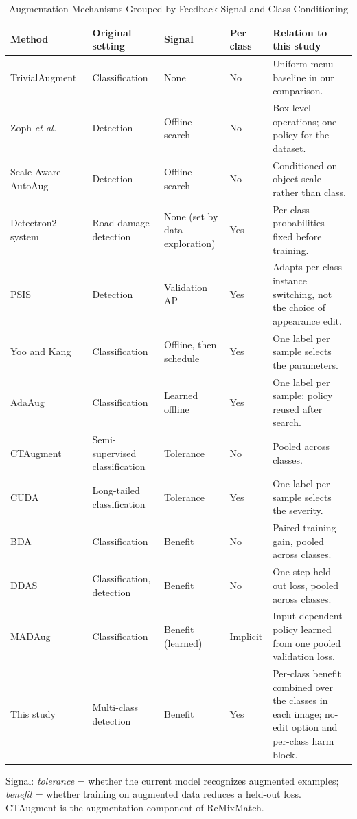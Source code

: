 \documentclass[conference]{IEEEtran}
\begin{document}
\begin{table}[t]
\caption{Augmentation Mechanisms Grouped by Feedback Signal and Class Conditioning}
\label{tab:policies}
\centering
\small
\setlength{\tabcolsep}{4pt}
\renewcommand{\arraystretch}{1.16}
\begin{tabularx}{\textwidth}{@{}p{}p{}p{}p{}Y@{}}
\toprule
\textbf{Method} & \textbf{Original setting} & \textbf{Signal} & \textbf{Per class} & \textbf{Relation to this study} \\
\midrule
TrivialAugment~\cite{muller2021trivial} & Classification & None & No & Uniform-menu baseline in our comparison. \\
Zoph \emph{et al.}~\cite{zoph2020det} & Detection & Offline search & No & Box-level operations; one policy for the dataset. \\
Scale-Aware AutoAug~\cite{chen2021scale} & Detection & Offline search & No & Conditioned on object scale rather than class. \\
Detectron2 system~\cite{rdd_detectron2} & Road-damage detection & None (set by data exploration) & Yes & Per-class probabilities fixed before training. \\
PSIS~\cite{wang2019psis} & Detection & Validation AP & Yes & Adapts per-class instance switching, not the choice of appearance edit. \\
Yoo and Kang~\cite{yoo2023} & Classification & Offline, then schedule & Yes & One label per sample selects the parameters. \\
AdaAug~\cite{cheung2022adaaug} & Classification & Learned offline & Yes & One label per sample; policy reused after search. \\
CTAugment~\cite{berthelot2020} & Semi-supervised classification & Tolerance & No & Pooled across classes. \\
CUDA~\cite{ahn2023cuda} & Long-tailed classification & Tolerance & Yes & One label per sample selects the severity. \\
BDA~\cite{lu2023bda} & Classification & Benefit & No & Paired training gain, pooled across classes. \\
DDAS~\cite{liu2021ddas} & Classification, detection & Benefit & No & One-step held-out loss, pooled across classes. \\
MADAug~\cite{hou2023madaug} & Classification & Benefit (learned) & Implicit & Input-dependent policy learned from one pooled validation loss. \\
This study & Multi-class detection & Benefit & Yes & Per-class benefit combined over the classes in each image; no-edit option and per-class harm block. \\
\bottomrule
\end{tabularx}
\vspace{3pt}
\begin{minipage}{\textwidth}
\footnotesize
Signal: \emph{tolerance} = whether the current model recognizes augmented examples; \emph{benefit} = whether training on augmented data reduces a held-out loss. CTAugment is the augmentation component of ReMixMatch.
\end{minipage}
\end{table}
\end{document}
